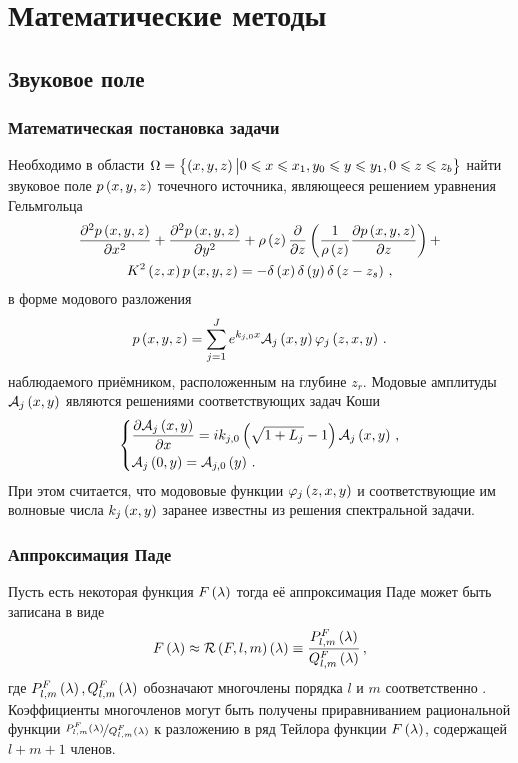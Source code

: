 \documentclass[../document.tex]{subfiles}
\begin{document}
	\section{Математические методы}
		\subsection{Звуковое поле}
			\subsubsection{Математическая постановка задачи}
				\par Необходимо в области $\Omega=\left\{\left(x,y,z\right)\big|0\leqslant x\leqslant x_1,y_0\leqslant y\leqslant y_1,0\leqslant z\leqslant z_b\right\}$ найти звуковое поле $p\left(x,y,z\right)$ точечного источника, являющееся решением уравнения Гельмгольца
				\begin{multline}
					\frac{\partial^2p\left(x,y,z\right)}{\partial x^2}+\frac{\partial^2p\left(x,y,z\right)}{\partial y^2}+\rho\left(z\right)\frac{\partial}{\partial z}\left(\frac{1}{\rho\left(z\right)}\frac{\partial p\left(x,y,z\right)}{\partial z}\right)+\\
					K^2\left(z,x\right)p\left(x,y,z\right)=-\delta\left(x\right)\delta\left(y\right)\delta\left(z-z_s\right)\,,
				\end{multline}
				в форме модового разложения
				\begin{equation}
					p\left(x,y,z\right)=\sum\limits_{j=1}^Je^{k_{j,0}x}\mathcal{A}_j\left(x,y\right)\varphi_j\left(z,x,y\right)\,.
				\end{equation}
				наблюдаемого приёмником, расположенным на глубине $z_r$. Модовые амплитуды $\mathcal{A}_j\left(x,y\right)$ являются решениями соответствующих задач Коши
				\begin{equation}\label{eq::WAMPE_problem}
					\begin{dcases}
						\frac{\partial\mathcal{A}_j\left(x,y\right)}{\partial x}=ik_{j,0}\left(\sqrt{1+L_j}-1\right)\mathcal{A}_j\left(x,y\right)\,,\\
						\mathcal{A}_j\left(0,y\right)=\mathcal{A}_{j,0}\left(y\right)\,.
					\end{dcases}
				\end{equation}
				При этом считается, что модововые функции $\varphi_j\left(z,x,y\right)$ и соответствующие им волновые числа $k_j\left(x,y\right)$ заранее известны из решения спектральной задачи.
			\subsubsection{Аппроксимация Паде}
				\par Пусть есть некоторая функция $F\left(\lambda\right)$ тогда её аппроксимация Паде может быть записана в виде
				\begin{equation}\label{eq::pade}
					F\left(\lambda\right)\approx\mathcal{R}\left(F,l,m\right)\left(\lambda\right)\equiv\frac{P_{l,m}^F\left(\lambda\right)}{Q_{l,m}^F\left(\lambda\right)}\,,
				\end{equation}
				где $P_{l,m}^F\left(\lambda\right),Q_{l,m}^F\left(\lambda\right)$ обозначают многочлены порядка $l$ и $m$ соответственно \cite{jensen}. Коэффициенты многочленов могут быть получены приравниванием рациональной функции $\nicefrac{P_{l,m}^F\left(\lambda\right)}{Q_{l,m}^F\left(\lambda\right)}$ к разложению в ряд Тейлора функции $F\left(\lambda\right)$, содержащей $l+m+1$ членов.
\end{document}
